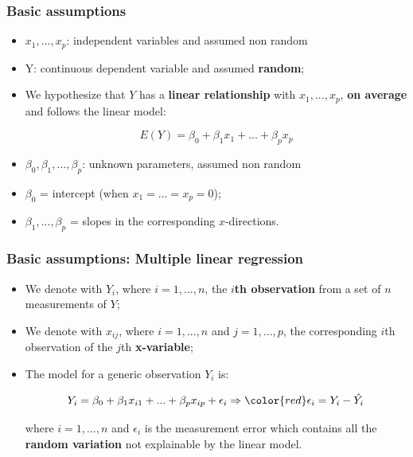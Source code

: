 \begin{frame}
    \frametitle{Basic assumptions}

    \begin{itemize}
        \item $x_1,...,x_p$: independent variables and assumed non random
        \item Y: continuous dependent variable and assumed \textbf{random};
        \item We hypothesize that $Y$ has a \textbf{linear relationship} with 
        $x_1,...,x_p$, \textbf{on average} and follows the linear model:

        $$E(Y) = \beta_0 + \beta_{1}x_1 + ... + \beta_{p}x_p$$

        \item $\beta_0,\beta_1,...,\beta_p$: unknown parameters, assumed non random
        \item $\beta_0$ = intercept (when $x_1 = ... = x_p = 0$);
        \item $\beta_1,...,\beta_p$ = slopes in the corresponding $x$-directions.
    \end{itemize}

\end{frame}


\begin{frame}
    \frametitle{Basic assumptions: Multiple linear regression}

    \begin{itemize}

        \item We denote with $Y_i$, where $i = 1,...,n$, the \textbf{$i$th observation}
        from a set of $n$ measurements of $Y$;

        \item We denote with $x_{ij}$, where $i = 1,...,n$ and $j = 1,...,p$, the
        corresponding $i$th observation of the $j$th \textbf{x-variable};

        \item The model for a generic observation $Y_i$ is:

        $$Y_i = \beta_0 + \beta_{1}x_{i1} + ... + \beta_{p}x_{ip} + \epsilon_i \Rightarrow {\color{red}\epsilon_i = Y_i - \hat{Y_i}}$$

        where $i = 1,...,n$ and $\epsilon_i$ is the measurement error which contains
        all the \textbf{random variation} not explainable by the linear model.

    \end{itemize}

\end{frame}

